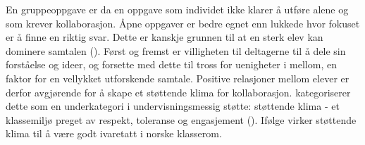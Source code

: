\documentclass[12pt,twoside,onecolumn,norsk]{article}
\begin{document}
En gruppeoppgave er da en oppgave som individet ikke klarer å utføre alene og som 
krever kollaborasjon. Åpne oppgaver er bedre egnet enn lukkede hvor fokuset er å finne 
en riktig svar. Dette er kanskje grunnen til at en sterk elev kan dominere samtalen 
(). Først og fremst er villigheten til deltagerne til å dele sin forståelse 
og ideer, og forsette med dette til tross for uenigheter i mellom, en faktor for en vellykket 
utforskende samtale. Positive relasjoner mellom elever er derfor avgjørende for å skape et støttende 
klima for kollaborasjon.  kategoriserer dette som en underkategori i 
undervisningsmessig støtte: støttende klima - et klassemiljø preget av respekt, toleranse og 
engasjement (). Ifølge  virker støttende klima til å være 
godt ivaretatt i norske klasserom.

\newpage\null


\end{document}
